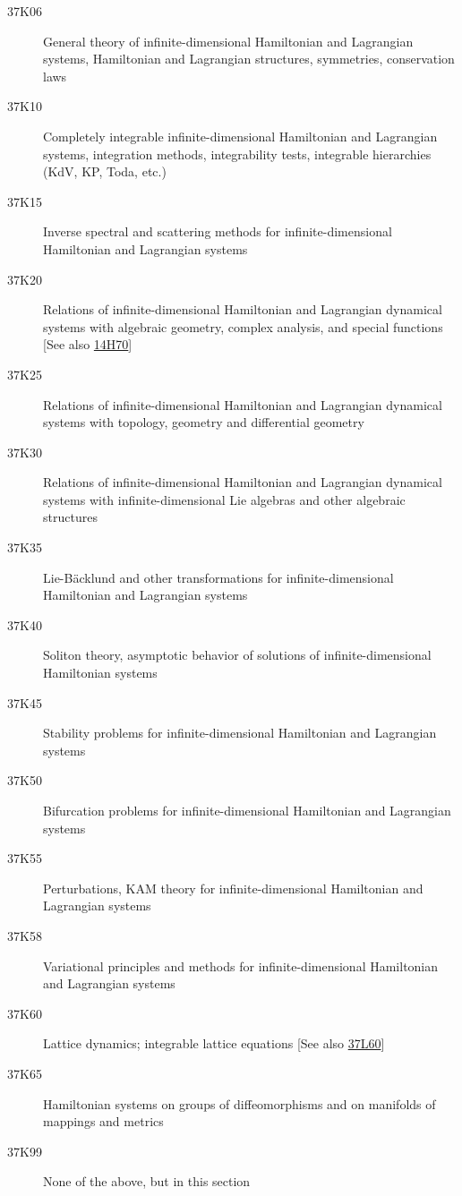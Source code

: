 \documentclass[letterpaper]{article}
\begin{document}
\begin{description} 
\item [37K06]\label{37K06} General theory of infinite-dimensional Hamiltonian and Lagrangian systems, Hamiltonian and Lagrangian structures, symmetries,  conservation laws
\item [37K10]\label{37K10} Completely integrable infinite-dimensional Hamiltonian and Lagrangian systems, integration methods, integrability tests, integrable hierarchies (KdV, KP, Toda, etc.)
\item [37K15]\label{37K15} Inverse spectral and scattering methods for infinite-dimensional Hamiltonian and Lagrangian systems
\item [37K20]\label{37K20}  Relations of infinite-dimensional Hamiltonian and Lagrangian dynamical systems with algebraic geometry, complex analysis, and special functions [See also \hyperref[14H70]{14H70}]
\item [37K25]\label{37K25} Relations of infinite-dimensional Hamiltonian and Lagrangian dynamical systems with topology, geometry and differential geometry
\item [37K30]\label{37K30} Relations of infinite-dimensional Hamiltonian and Lagrangian dynamical systems with infinite-dimensional Lie algebras and other algebraic structures
\item [37K35]\label{37K35} Lie-B\"{a}cklund and other transformations for infinite-dimensional Hamiltonian and Lagrangian systems
\item [37K40]\label{37K40} Soliton theory, asymptotic behavior of solutions of infinite-dimensional Hamiltonian systems
\item [37K45]\label{37K45} Stability problems for infinite-dimensional Hamiltonian and Lagrangian systems
\item [37K50]\label{37K50} Bifurcation problems for infinite-dimensional Hamiltonian and Lagrangian systems
\item [37K55]\label{37K55} Perturbations, KAM theory for infinite-dimensional Hamiltonian and Lagrangian systems
\item [37K58]\label{37K58} Variational principles and methods  for infinite-dimensional Hamiltonian and Lagrangian systems
\item [37K60]\label{37K60} Lattice dynamics; integrable lattice equations [See also \hyperref[37L60]{37L60}]
\item [37K65]\label{37K65} Hamiltonian systems on groups of diffeomorphisms and on manifolds of mappings and metrics
\item [37K99]\label{37K99} None of the above, but in this section
\end{description}
\end{document}
